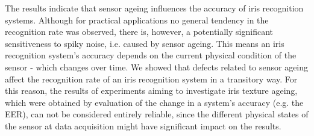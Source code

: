 \documentclass[10pt,twocolumn,letterpaper]{article}
\begin{document}
The results indicate that sensor ageing influences the accuracy of iris recognition systems. Although for practical applications no general tendency in the recognition rate was observed, there is, however, a potentially significant sensitiveness to spiky noise, i.e. caused by sensor ageing. This means an iris recognition system's accuracy depends on the current physical condition of the sensor - which changes over time. We showed that defects related to sensor ageing affect the recognition rate of an iris recognition system in a transitory way. For this reason, the results of experiments aiming to investigate iris texture ageing, which were obtained by evaluation of the change in a system's accuracy (e.g. the EER), can not be considered entirely reliable, since the different physical states of the sensor at data acquisition might have significant impact on the results.  
 
 




{\small


}

\end{document}
